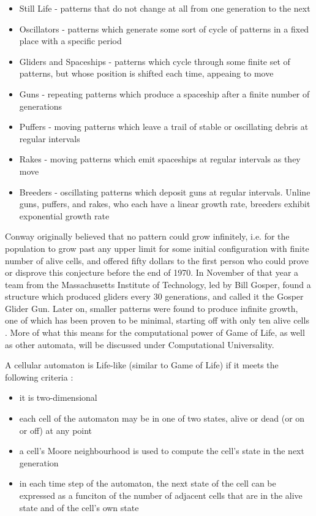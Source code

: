 \documentclass[11pt,a4paper]{article}
\begin{document}
    \begin{itemize}
        \item Still Life - patterns that do not change at all from one
            generation to the next
        \item Oscillators - patterns which generate some sort of cycle of
            patterns in a fixed place with a specific period
        \item Gliders and Spaceships - patterns which cycle through some finite
            set of patterns, but whose position is shifted each time, appeaing
            to move
        \item Guns - repeating patterns which produce a spaceship after a finite
            number of generations
        \item Puffers - moving patterns which leave a trail of stable or
            oscillating debris at regular intervals
        \item Rakes - moving patterns which emit spaceships at regular intervals
            as they move
        \item Breeders - oscillating patterns which deposit guns at regular
            intervals. Unline guns, puffers, and rakes, who each have a linear
            growth rate, breeders exhibit exponential growth rate
    \end{itemize}

    Conway originally believed that no pattern could grow infinitely, i.e. for
    the population to grow past any upper limit for some initial configuration
    with finite number of alive cells, and offered fifty dollars to the first
    person who could prove or disprove this conjecture before the end of 1970.
    In November of that year a team from the Massachusetts Institute of
    Technology, led by Bill Gosper, found a structure which produced gliders
    every 30 generations, and called it the Gosper Glider Gun. Later on, smaller
    patterns were found to produce infinite growth, one of which has been proven
    to be minimal, starting off with only ten alive cells
    \cite{infiniteGrowth}. More of what this means for the computational power
    of Game of Life, as well as other automata, will be discussed under
    Computational Universality.

    A cellular automaton is Life-like (similar to Game of Life) if it meets the
    following criteria \cite{LifeLike}:

    \begin{itemize}
        \item it is two-dimensional
        \item each cell of the automaton may be in one of two states, alive or
            dead (or on or off) at any point
        \item a cell's Moore neighbourhood is used to compute the cell's state
            in the next generation
        \item in each time step of the automaton, the next state of the cell can
            be expressed as a funciton of the number of adjacent cells that are
            in the alive state and of the cell's own state
    \end{itemize}
\end{document}
